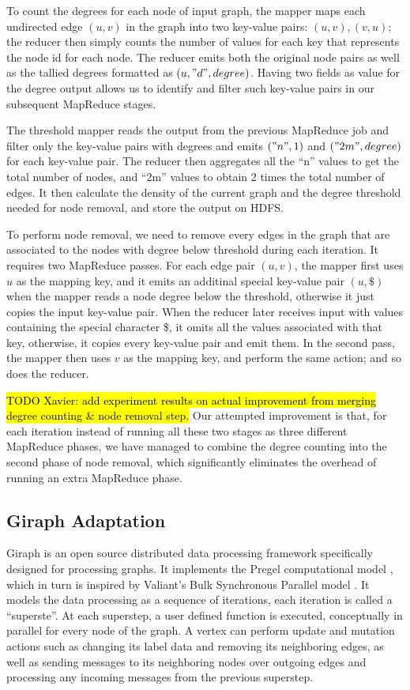 \documentclass{article}
\begin{document}
To count the degrees for each node of input graph, the mapper maps each undirected edge $(u,v)$ in the graph into two key-value pairs: $(u, v), (v, u)$; the reducer then simply counts the number of values for each key that represents the node id for each node. The reducer emits both the original node pairs as well as the tallied degrees formatted as $(u, "d", degree)$. Having two fields as value for the degree output allows us to identify and filter such key-value pairs in our subsequent MapReduce stages.

The threshold mapper reads the output from the previous MapReduce job and filter only the key-value pairs with degrees and emits $("n", 1)$ and $("2m", degree)$ for each key-value pair. The reducer then aggregates all the ``n'' values to get the total number of nodes, and ``2m'' values to obtain 2 times the total number of edges. It then calculate the density of the current graph and the degree threshold needed for node removal, and store the output on HDFS.

To perform node removal, we need to remove every edges in the graph that are associated to the nodes with degree below threshold during each iteration. It requires two MapReduce passes. For each edge pair $(u,v)$, the mapper first uses $u$ as the mapping key, and it emits an additinal special key-value pair $(u, \$)$ when the mapper reads a node degree below the threshold, otherwise it just copies the input key-value pair. When the reducer later receives input with values containing the special character \$, it omits all the values associated with that key, otherwise, it copies every key-value pair and emit them. In the second pass, the mapper then uses $v$ as the mapping key, and perform the same action; and so does the reducer.

\hl{TODO Xavier: add experiment results on actual improvement from merging degree counting \& node removal step.}
Our attempted improvement is that, for each iteration instead of running all these two stages as three different MapReduce phases, we have managed to combine the degree counting into the second phase of node removal, which significantly eliminates the overhead of running an extra MapReduce phase.

\subsection{Giraph Adaptation}
Giraph is an open source distributed data processing framework specifically designed for processing graphs. It implements the Pregel computational model \cite{Malewicz:2010:PSL:1807167.1807184}, which in turn is inspired by Valiant’s Bulk Synchronous Parallel model \cite{Valiant:1990:BMP:79173.79181}. It models the data processing as a sequence of iterations, each iteration is called a ``superste''. At each superstep, a user defined function is executed, conceptually in parallel for every node of the graph. A vertex can perform update and mutation actions such as changing its label data and removing its neighboring edges, as well as sending messages to its neighboring nodes over outgoing edges and processing any incoming messages from the previous superstep.
\end{document}

